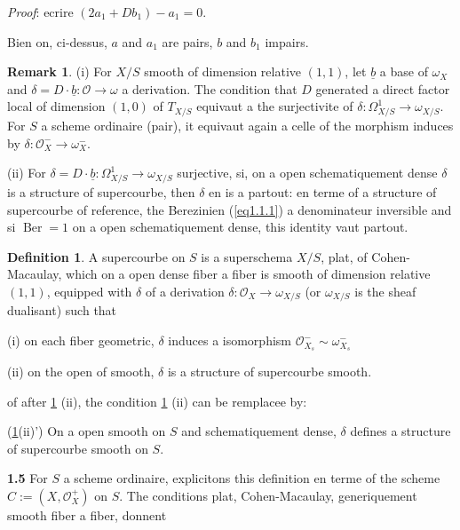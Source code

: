 \documentclass[11pt,a4paper]{article}
\theoremstyle{plain}
\theoremstyle{definition}
\newtheorem{definition}[theorem]{Definition}
\newtheorem{remark}[theorem]{Remark}
\DeclareMathOperator{\Ber}{Ber}
\begin{document}
\noindent \textit{Proof}: ecrire $(2a_1 + Db_1) - a_1 = 0$.

Bien on, ci-dessus, $a$ and $a_1$ are pairs, $b$ and $b_1$ impairs.

\begin{remark}\label{rem1.3}
(i) For $X/S$ smooth of dimension relative $(1,1)$, let $\underline{b}$ a base of $\omega_X$ and $\delta = D \cdot \underline{b} : \mathcal{O} \to \omega$ a derivation. The condition that $D$ generated a direct factor local of dimension $(1,0)$ of $T_{X/S}$ equivaut a the surjectivite of $\delta : \Omega^1_{X/S} \to \omega_{X/S}$. For $S$ a scheme ordinaire (pair), it equivaut again a celle of the morphism induces by $\delta : \mathcal{O}_X^- \to \omega_X^-$.

(ii) For $\delta = D \cdot \underline{b} : \Omega^1_{X/S} \to \omega_{X/S}$ surjective, si, on a open schematiquement dense $\delta$ is a structure of supercourbe, then $\delta$ en is a partout: en terme of a structure of supercourbe of reference, the Berezinien (\ref{eq1.1.1}) a denominateur inversible and si $\Ber = 1$ on a open schematiquement dense, this identity vaut partout.
\end{remark}

\begin{definition}\label{def1.4}
A supercourbe on $S$ is a superschema $X/S$, plat, of Cohen-Macaulay, which on a open dense fiber a fiber is smooth of dimension relative $(1,1)$, equipped with $\delta$ of a derivation $\delta : \mathcal{O}_X \to \omega_{X/S}$ (or $\omega_{X/S}$ is the sheaf dualisant) such that

\noindent (i) on each fiber geometric, $\delta$ induces a isomorphism $\mathcal{O}_{X_s}^- \sim \omega_{X_s}^-$

\noindent (ii) on the open of smooth, $\delta$ is a structure of supercourbe smooth.
\end{definition}

of after \ref{rem1.3} (ii), the condition \ref{def1.4} (ii) can be remplacee by:

\noindent (\ref{def1.4}(ii)') On a open smooth on $S$ and schematiquement dense, $\delta$ defines a structure of supercourbe smooth on $S$.

\medskip

\noindent \textbf{1.5} For $S$ a scheme ordinaire, explicitons this definition en terme of the scheme $C := (X, \mathcal{O}_X^+)$ on $S$. The conditions plat, Cohen-Macaulay, generiquement smooth fiber a fiber, donnent
\end{document}
